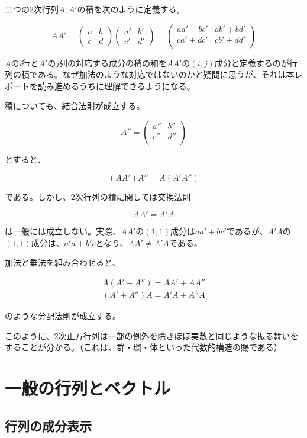 \documentclass[dvipdfmx,autodetect-engine]{jsarticle}
\theoremstyle{definition}
\begin{document}
二つの2次行列$A, A'$の積を次のように定義する。

$$
AA' = \begin{pmatrix}
a & b \\
c & d
\end{pmatrix}
\begin{pmatrix}
a' & b' \\
c' & d'
\end{pmatrix} = 
\begin{pmatrix}
aa' + bc' & ab' + bd' \\
ca' + dc' & cb' + dd' \\
\end{pmatrix}
$$

$A$の$i$行と$A'$の$j$列の対応する成分の積の和を$AA'$の$(i, j)$成分と定義するのが行列の積である。なぜ加法のような対応ではないのかと疑問に思うが、それは本レポートを読み進めるうちに理解できるようになる。

積についても、結合法則が成立する。

$$
A'' = \begin{pmatrix}
a'' & b'' \\
c'' & d'' \\
\end{pmatrix}
$$

とすると、

$$
(AA')A'' = A(A'A'')
$$

である。しかし、2次行列の積に関しては交換法則

$$
AA' = A'A
$$

は一般には成立しない。実際、$AA'$の$(1, 1)$成分は$aa' + bc'$であるが、$A'A$の$(1, 1)$成分は、$a'a + b'c$となり、$AA' \neq A'A$である。

加法と乗法を組み合わせると、

\begin{eqnarray*}
A(A' + A'') = AA' + AA'' \\
(A' + A'')A = A'A + A''A
\end{eqnarray*}

のような分配法則が成立する。

このように、2次正方行列は一部の例外を除きほぼ実数と同じような振る舞いをすることが分かる。（これは、群・環・体といった代数的構造の賜である）

\section{一般の行列とベクトル}

\subsection{行列の成分表示}
\end{document}
